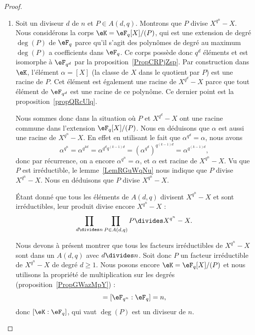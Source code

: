 \begin{proof}
    \begin{enumerate}
        \item
            Soit un diviseur \( d\) de \( n\) et \( P\in A(d,q)\). Montrons que \( P\) divise \( X^{q^n}-X\). Nous considérons la corps \( \eK=\eF_q[X]/(P)\), qui est une extension de degré \( \deg(P)\) de \( \eF_q\) parce qu'il s'agit des polynômes de degré au maximum \( \deg(P)\) a coefficients dans \( \eF_q\). Ce corps possède donc \( q^d\) éléments et est isomorphe à \( \eF_{q^d}\) par la proposition~\ref{PropCRPjZsp}. Par construction dans \( \eK\), l'élément \( \alpha=[X]\) (la classe de \( X\) dans le quotient par \( P\)) est une racine de \( P\). Cet élément est également une racine de \( X^{q^d}-X\) parce que tout élément de \( \eF_{q^d}\) est une racine de ce polynôme. Ce dernier point est la proposition~\ref{propQRcUlq}.

            Nous sommes donc dans la situation où \( P\) et \( X^{q^d}-X\) ont une racine commune dans l'extension \( \eF_q[X]/(P)\). Nous en déduisons que \( \alpha\) est aussi une racine de \( X^{q^n}-X\). En effet en utilisant le fait que \( \alpha^{q^d}=\alpha\), nous avons
            \begin{equation}
                \alpha^{q^n}=\alpha^{q^{kd}}=\alpha^{q^dq^{(k-1)d}}=\left( \alpha^{q^d} \right)^{q^{(k-1)d}}=\alpha^{q^{(k-1)d}},
            \end{equation}
            donc par récurrence, on a encore \( \alpha^{q^n}=\alpha\), et \( \alpha\) est racine de \( X^{q^n}-X\). Vu que \( P\) est irréductible, le lemme~\ref{LemRGuWqNu} nous indique que \( P\) divise \( X^{q^n}-X\). Nous en déduisons que \( P\) divise \( X^{q^n}-X\).

            Étant donné que tous les éléments de \( A(d,q)\) divisent \( X^{q^n}-X\) et sont irréductibles, leur produit divise encore \( X^{q^n}-X\) :
            \begin{equation}
                \prod_{d\divides n}\prod_{P\in A(d,q)}P\divides X^{q^n}-X.
            \end{equation}

            Nous devons à présent montrer que tous les facteurs irréductibles de \( X^{q^n}-X\) sont dans un \( A(d,q)\) avec \( d\divides n\). Soit donc \( P\) un facteur irréductible de \( X^{q^n}-X\) de degré \( d\geq 1\). Nous posons encore \( \eK=\eF_q[X]/(P)\) et nous utilisons la propriété de multiplication sur les degrés (proposition~\ref{PropGWazMpY}) :
            \begin{equation}
                [\eF_{q^n}:\eK][\eK:\eF_q]=[\eF_{q^n}:\eF_q]=n,
            \end{equation}
            donc \( [\eK:\eF_q]\), qui vaut \( \deg(P)\) est un diviseur de \( n\).


\end{enumerate}
\end{proof}
